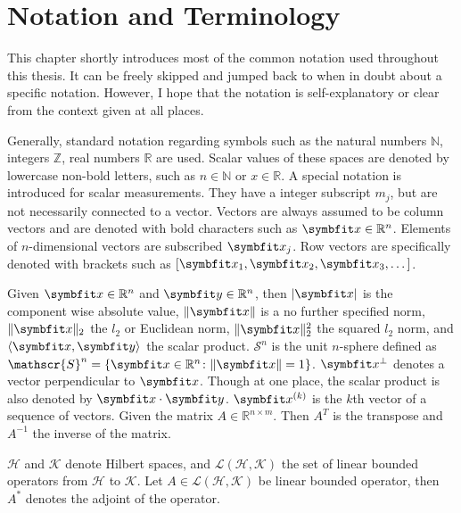 \chapter{Notation and Terminology}\label{chap:notation}

This chapter shortly introduces most of the common notation used throughout this thesis. It can be
freely skipped and jumped back to when in doubt about a specific notation. However, I hope that the
notation is self-explanatory or clear from the context given at all places.

Generally, standard notation regarding symbols such as the natural numbers \(\mathbb{N}\), integers
\(\mathbb{Z}\), real numbers \(\mathbb{R}\) are used. Scalar values of these spaces are denoted by
lowercase non-bold letters, such as \(n \in \mathbb{N}\) or \(x \in \mathbb{R}\). A special notation
is introduced for scalar measurements. They have a integer subscript \(m_j\), but are not
necessarily connected to a vector. Vectors are always assumed to be column vectors and are denoted
with bold characters such as \(\mvec{x} \in \mathbb{R}^n\). Elements of \(n\)-dimensional vectors
are subscribed \(\mvec{x}_j\). Row vectors are specifically denoted with brackets such as
\([\mvec{x}_1, \mvec{x}_2, \mvec{x}_3, \dots ]\).

Given \(\mvec{x} \in \mathbb{R}^n\) and \(\mvec{y} \in \mathbb{R}^n\), then \(\abs{\mvec{x}}\) is
the component wise absolute value, \(\norm{\mvec{x}}\) is a no further specified norm,
\(\norm{\mvec{x}}_2\) the \(l_2\) or Euclidean norm, \(\norm{\mvec{x}}^2_2\) the squared \(l_2\)
norm, and \(\langle \mvec{x}, \mvec{y} \rangle\) the scalar product. \(\mathscr{S}^n\) is the unit
\(n\)-sphere defined as \(\mathscr{S}^n = \{\mvec{x} \in \mathbb{R}^n \colon \norm{\mvec{x}} = 1
\}\). \(\mvec{x}^\perp\) denotes a vector perpendicular to \(\mvec{x}\). Though at one place, the
scalar product is also denoted by \(\mvec{x} \cdot \mvec{y}\). \(\mvec{x}^{(k)}\) is the \(k\)th
vector of a sequence of vectors. Given the matrix \(A \in \mathbb{R}^{n \times m}\). Then \(A^T\) is
the transpose and \(A^{-1}\) the inverse of the matrix.

\(\mathcal{H}\) and \(\mathcal{K}\) denote Hilbert spaces, and \(\mathscr{L}(\mathcal{H},
\mathcal{K})\) the set of linear bounded operators from \(\mathcal{H}\) to \(\mathcal{K}\). Let \(A
\in \mathscr{L}(\mathcal{H}, \mathcal{K})\) be linear bounded operator, then \(A^\ast\) denotes the
adjoint of the operator.


